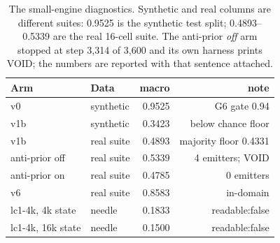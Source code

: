 \begin{table}[t]
\centering
\small
\caption{The small-engine diagnostics. Synthetic and real columns are
different suites: 0.9525 is the synthetic test split; 0.4893--0.5339 are the
real 16-cell suite. The anti-prior \emph{off} arm stopped at step 3{,}314 of
3{,}600 and its own harness prints VOID; the numbers are reported with that
sentence attached.}
\label{tab:diagnostics}
\begin{tabular}{llrr}
\toprule
Arm & Data & macro & note \\
\midrule
v0 & synthetic & 0.9525 & G6 gate 0.94 \\
v1b & synthetic & 0.3423 & below chance floor \\
v1b & real suite & 0.4893 & majority floor 0.4331 \\
anti-prior off & real suite & 0.5339 & 4 emitters; VOID \\
anti-prior on & real suite & 0.4785 & 0 emitters \\
v6 & real suite & 0.8583 & in-domain \\
\midrule
lc1-4k, 4k state & needle & 0.1833 & readable:false \\
lc1-4k, 16k state & needle & 0.1500 & readable:false \\
\bottomrule
\end{tabular}
\end{table}
